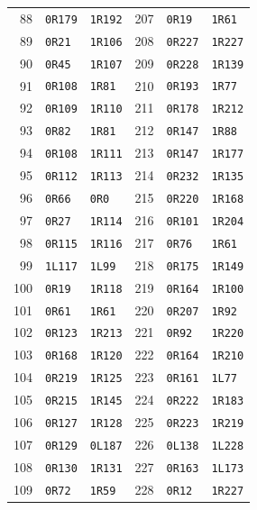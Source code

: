 \begin{longtable}{rll@{\qquad}rll}
88 & \texttt{0R179} & \texttt{1R192} & 207 & \texttt{0R19} & \texttt{1R61}\\
89 & \texttt{0R21} & \texttt{1R106} & 208 & \texttt{0R227} & \texttt{1R227}\\
90 & \texttt{0R45} & \texttt{1R107} & 209 & \texttt{0R228} & \texttt{1R139}\\
91 & \texttt{0R108} & \texttt{1R81} & 210 & \texttt{0R193} & \texttt{1R77}\\
92 & \texttt{0R109} & \texttt{1R110} & 211 & \texttt{0R178} & \texttt{1R212}\\
93 & \texttt{0R82} & \texttt{1R81} & 212 & \texttt{0R147} & \texttt{1R88}\\
94 & \texttt{0R108} & \texttt{1R111} & 213 & \texttt{0R147} & \texttt{1R177}\\
95 & \texttt{0R112} & \texttt{1R113} & 214 & \texttt{0R232} & \texttt{1R135}\\
96 & \texttt{0R66} & \texttt{0R0} & 215 & \texttt{0R220} & \texttt{1R168}\\
97 & \texttt{0R27} & \texttt{1R114} & 216 & \texttt{0R101} & \texttt{1R204}\\
98 & \texttt{0R115} & \texttt{1R116} & 217 & \texttt{0R76} & \texttt{1R61}\\
99 & \texttt{1L117} & \texttt{1L99} & 218 & \texttt{0R175} & \texttt{1R149}\\
100 & \texttt{0R19} & \texttt{1R118} & 219 & \texttt{0R164} & \texttt{1R100}\\
101 & \texttt{0R61} & \texttt{1R61} & 220 & \texttt{0R207} & \texttt{1R92}\\
102 & \texttt{0R123} & \texttt{1R213} & 221 & \texttt{0R92} & \texttt{1R220}\\
103 & \texttt{0R168} & \texttt{1R120} & 222 & \texttt{0R164} & \texttt{1R210}\\
104 & \texttt{0R219} & \texttt{1R125} & 223 & \texttt{0R161} & \texttt{1L77}\\
105 & \texttt{0R215} & \texttt{1R145} & 224 & \texttt{0R222} & \texttt{1R183}\\
106 & \texttt{0R127} & \texttt{1R128} & 225 & \texttt{0R223} & \texttt{1R219}\\
107 & \texttt{0R129} & \texttt{0L187} & 226 & \texttt{0L138} & \texttt{1L228}\\
108 & \texttt{0R130} & \texttt{1R131} & 227 & \texttt{0R163} & \texttt{1L173}\\
109 & \texttt{0R72} & \texttt{1R59} & 228 & \texttt{0R12} & \texttt{1R227}\\

\end{longtable}
